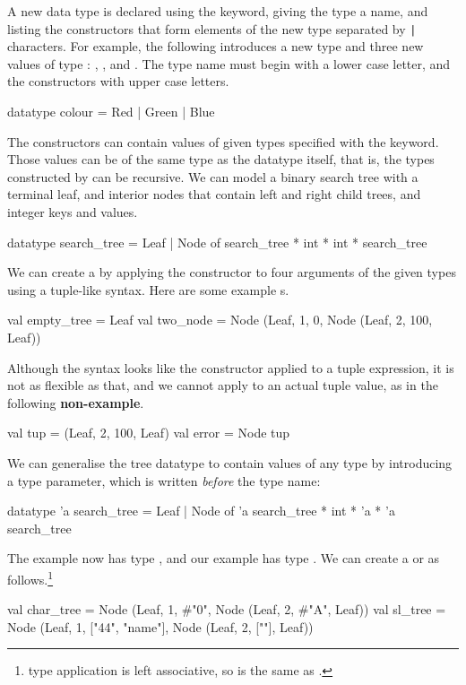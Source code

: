\documentclass[12pt,a4paper]{book}
\begin{document}
A new data type is declared using the  keyword, giving the
type a name, and listing the constructors that form elements of the new type
separated by \texttt{|} characters. For example, the following introduces a new type  and three new values of type : , , and .
The type name must begin with a lower case letter, and the constructors with upper case letters.
\begin{smlcode}
datatype colour = Red | Green | Blue
\end{smlcode}

The constructors can contain values of given types specified with the
 keyword. Those values can be of the same type as the datatype
itself, that is, the types constructed by  can be recursive.
We can model a binary search tree with a terminal leaf, and interior nodes that
contain left and right child trees, and integer keys and values.
\begin{smlcode}
datatype search_tree =
  Leaf
| Node of search_tree * int * int * search_tree
\end{smlcode}
We can create a  by applying the constructor to four
arguments of the given types using a tuple-like syntax. Here are some example
s.
\begin{smlcode}
val empty_tree = Leaf
val two_node = Node (Leaf, 1, 0, Node (Leaf, 2, 100, Leaf))
\end{smlcode}
Although the syntax looks like the constructor applied to a tuple expression,
it is not as flexible as that, and we cannot apply  to an
actual tuple value, as in the following \textbf{non-example}.
\begin{smlcode}
val tup = (Leaf, 2, 100, Leaf)
val error = Node tup
\end{smlcode}

We can generalise the tree datatype to contain values of any type by
introducing a type parameter, which is written \emph{before} the type name:
\begin{smlcode}
datatype 'a search_tree =
  Leaf
| Node of 'a search_tree * int * 'a * 'a search_tree
\end{smlcode}
The  example now has type , and our
 example has type . We can create a
 or  as follows.\footnote{type application is left associative, so  is the same as .}
\begin{smlcode}
val char_tree = Node (Leaf, 1, #"0", Node (Leaf, 2, #"A", Leaf))
val sl_tree = Node (Leaf, 1, ["44", "name"], Node (Leaf, 2, [""], Leaf))
\end{smlcode}
\end{document}
